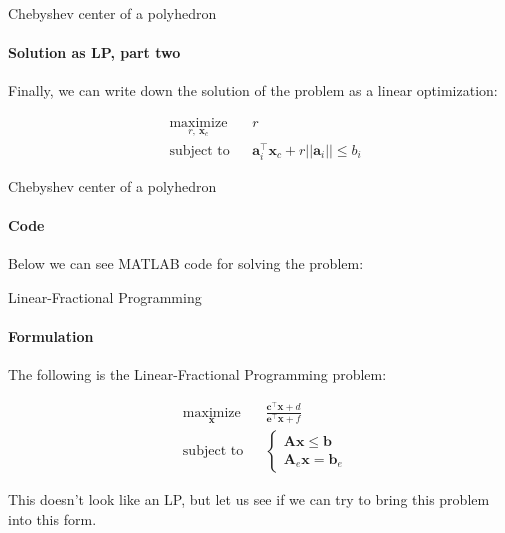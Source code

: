 \documentclass{beamer}
\begin{document}
\begin{frame}{Chebyshev center of a polyhedron}
\framesubtitle{Solution as LP, part two}
\begin{flushleft}

Finally, we can write down the solution of the problem as a linear optimization:

\begin{equation}
\begin{aligned}
& \underset{r, \ \mathbf{x}_c}{\text{maximize}}
& & r \\
& \text{subject to}
& & \mathbf{a}_i^\top \mathbf{x}_c + r ||\mathbf{a}_i||
    \leq b_i
%
\end{aligned}
\end{equation}

 
\end{flushleft}
\end{frame}




\begin{frame}{Chebyshev center of a polyhedron}
\framesubtitle{Code}
\begin{flushleft}

Below we can see MATLAB code for solving the problem:



 
\end{flushleft}
\end{frame}




\begin{frame}{Linear-Fractional Programming}
	\framesubtitle{Formulation}
	\begin{flushleft}
		
		The following is the Linear-Fractional Programming problem:
		
		\begin{equation}
			\begin{aligned}
				& \underset{\mathbf{x}}{\text{maximize}}
				& & \frac{\mathbf{c}^\top \mathbf{x} + d}{\mathbf{e}^\top \mathbf{x} + f} \\
				& \text{subject to}
				& & 
				 \begin{cases}
				 	\mathbf{A} \mathbf{x} \leq \mathbf{b} \\
				 	\mathbf{A}_e \mathbf{x} = \mathbf{b}_e
				 \end{cases}
			\end{aligned}
		\end{equation}
		
		This doesn't look like an LP, but let us see if we can try to bring this problem into this form. 
		
	\end{flushleft}
\end{frame}
\end{document}
